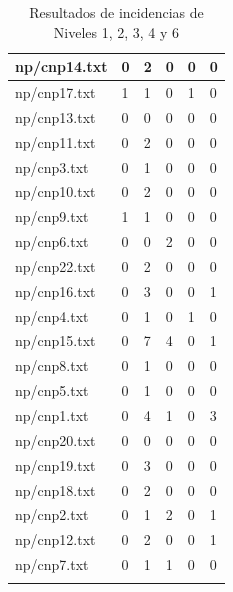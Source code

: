 \begin{center}
\begin{longtable}{|l|l|l|l|l|l|}
\hline
np/cnp14.txt & 0 & 2 & 0 & 0 & 0 \\
\hline
np/cnp17.txt & 1 & 1 & 0 & 1 & 0 \\
\hline
np/cnp13.txt & 0 & 0 & 0 & 0 & 0 \\
\hline
np/cnp11.txt & 0 & 2 & 0 & 0 & 0 \\
\hline
np/cnp3.txt & 0 & 1 & 0 & 0 & 0 \\
\hline
np/cnp10.txt & 0 & 2 & 0 & 0 & 0 \\
\hline
np/cnp9.txt & 1 & 1 & 0 & 0 & 0 \\
\hline
np/cnp6.txt & 0 & 0 & 2 & 0 & 0 \\
\hline
np/cnp22.txt & 0 & 2 & 0 & 0 & 0 \\
\hline
np/cnp16.txt & 0 & 3 & 0 & 0 & 1 \\
\hline
np/cnp4.txt & 0 & 1 & 0 & 1 & 0 \\
\hline
np/cnp15.txt & 0 & 7 & 4 & 0 & 1 \\
\hline
np/cnp8.txt & 0 & 1 & 0 & 0 & 0 \\
\hline
np/cnp5.txt & 0 & 1 & 0 & 0 & 0 \\
\hline
np/cnp1.txt & 0 & 4 & 1 & 0 & 3 \\
\hline
np/cnp20.txt & 0 & 0 & 0 & 0 & 0 \\
\hline
np/cnp19.txt & 0 & 3 & 0 & 0 & 0 \\
\hline
np/cnp18.txt & 0 & 2 & 0 & 0 & 0 \\
\hline
np/cnp2.txt & 0 & 1 & 2 & 0 & 1 \\
\hline
np/cnp12.txt & 0 & 2 & 0 & 0 & 1 \\
\hline
\pagebreak
np/cnp7.txt & 0 & 1 & 1 & 0 & 0 \\ 
\hline

\caption{Resultados de incidencias de Niveles 1, 2, 3, 4 y 6 }
\label{table:resultadosNiveles}
\end{longtable}
\end{center}



